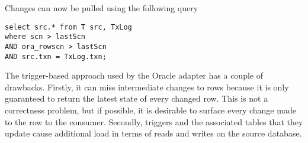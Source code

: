 Changes can now be pulled using the following query

\begin{verbatim}
select src.* from T src, TxLog 
where scn > lastScn 
AND ora_rowscn > lastScn 
AND src.txn = TxLog.txn;
\end{verbatim}

The trigger-based approach used by the Oracle adapter has a couple of drawbacks. Firstly, it can miss intermediate changes to rows because it is only guaranteed to return the latest state of every changed row. This is not a correctness problem, but if possible, it is desirable to surface every change made to the row to the consumer.
Secondly, triggers and the associated tables that they update cause additional load in terms of reads and writes on the source database.


